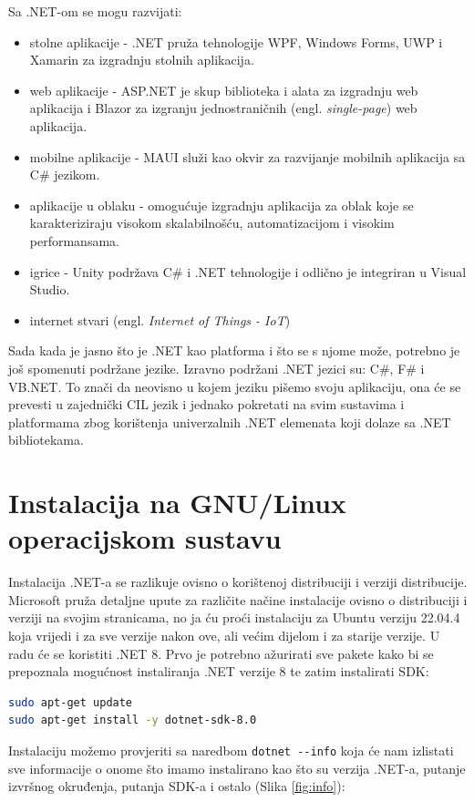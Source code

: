 \documentclass{foi}
\begin{document}
\begin{flushleft}
Sa .NET-om se mogu razvijati\cite{sharpcorner}:
\end{flushleft}
\begin{itemize}
    \item stolne aplikacije - .NET pruža tehnologije WPF, Windows Forms, UWP i Xamarin za izgradnju stolnih aplikacija.
    \item web aplikacije - ASP.NET je skup biblioteka i alata za izgradnju web aplikacija i Blazor za izgranju jednostraničnih (engl. \textit{single-page}) web aplikacija.
    \item mobilne aplikacije - MAUI služi kao okvir za razvijanje mobilnih aplikacija sa C\# jezikom.
    \item aplikacije u oblaku - omogućuje izgradnju aplikacija za oblak koje se karakteriziraju visokom skalabilnošću, automatizacijom i visokim performansama.
    \item igrice - Unity podržava C\# i .NET tehnologije i odlično je integriran u Visual Studio.
    \item internet stvari (engl. \textit{Internet of Things - IoT})
\end{itemize}
Sada kada je jasno što je .NET kao platforma i što se s njome može, potrebno je još spomenuti podržane jezike. Izravno podržani .NET jezici su: C\#, F\# i VB.NET. To znači da neovisno u kojem jeziku pišemo svoju aplikaciju, ona će se prevesti u zajednički CIL jezik i jednako pokretati na svim sustavima i platformama zbog korištenja univerzalnih .NET elemenata koji dolaze sa .NET bibliotekama.

\section{Instalacija na GNU/Linux operacijskom sustavu}
Instalacija .NET-a se razlikuje ovisno o korištenoj distribuciji i verziji distribucije. Microsoft pruža detaljne upute za različite načine instalacije ovisno o distribuciji i verziji na svojim stranicama, no ja ću proći instalaciju za Ubuntu verziju 22.04.4 koja vrijedi i za sve verzije nakon ove, ali većim dijelom i za starije verzije. U radu će se koristiti .NET 8. Prvo je potrebno ažurirati sve pakete kako bi se prepoznala mogućnost instaliranja .NET verzije 8 te zatim instalirati SDK\cite{netinstall}:

\begin{lstlisting}[language=bash]
sudo apt-get update
sudo apt-get install -y dotnet-sdk-8.0
\end{lstlisting}
Instalaciju možemo provjeriti sa naredbom \verb|dotnet --info| koja će nam izlistati sve informacije o onome što imamo instalirano kao što su verzija .NET-a, putanje izvršnog okruđenja, putanja SDK-a i ostalo (Slika \ref{fig:info}):
\end{document}
